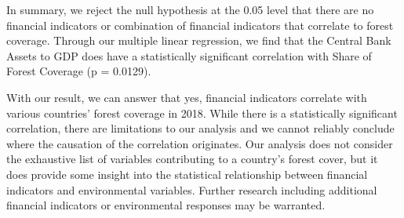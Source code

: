 \documentclass[
  12pt,
]{article}
\begin{document}
In summary, we reject the null hypothesis at the 0.05 level that there
are no financial indicators or combination of financial indicators that
correlate to forest coverage. Through our multiple linear regression, we
find that the Central Bank Assets to GDP does have a statistically
significant correlation with Share of Forest Coverage (p = 0.0129).

With our result, we can answer that yes, financial indicators correlate
with various countries' forest coverage in 2018. While there is a
statistically significant correlation, there are limitations to our
analysis and we cannot reliably conclude where the causation of the
correlation originates. Our analysis does not consider the exhaustive
list of variables contributing to a country's forest cover, but it does
provide some insight into the statistical relationship between financial
indicators and environmental variables. Further research including
additional financial indicators or environmental responses may be
warranted.
\end{document}
